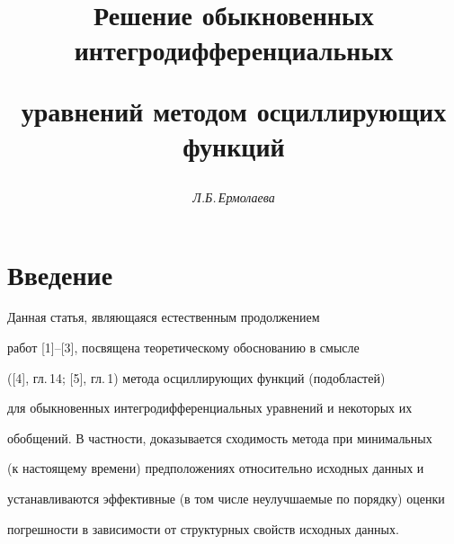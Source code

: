 








\author{\it Л.Б.\,Ермолаева}




\title{Решение обыкновенных интегродифференциальных


уравнений методом осциллирующих функций}





\date{}




\pagestyle{plain} %







\maketitle


\label{begin}








\section*{Введение}





Данная статья, являющаяся естественным продолжением


работ [1]--[3], посвящена теоретическому обоснованию в смысле


([4], гл.\,14; [5], гл.\,1) метода осциллирующих функций (подобластей) 


для обыкновенных интегродифференциальных уравнений и некоторых их 


обобщений. В частности, доказывается сходимость метода при минимальных


(к настоящему времени) предположениях относительно исходных данных и 


устанавливаются эффективные (в том числе неулучшаемые по порядку) оценки 


погрешности в зависимости от структурных свойств исходных данных. 


